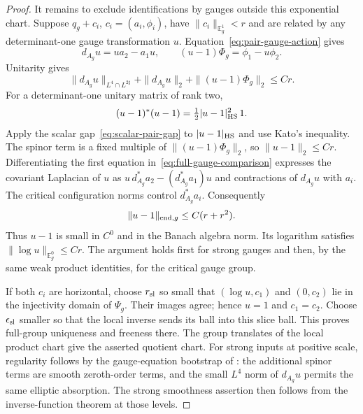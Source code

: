 \documentclass[11pt]{amsart}
\theoremstyle{definition}
\theoremstyle{remark}
\theoremstyle{plain}
\begin{document}
\begin{proof}
It remains to exclude identifications by gauges outside this exponential
chart.  Suppose $q_g+c_i$, $c_i=(a_i,\phi_i)$, have
$\|c_i\|_{\mathbb E_g^1}<r$ and are related by any determinant-one
gauge transformation $u$.
Equation~\eqref{eq:pair-gauge-action} gives
\begin{equation}\label{eq:full-gauge-comparison}
 d_{A_g}u=u a_2-a_1u,\qquad
 (u-1)\Phi_g=\phi_1-u\phi_2.
\end{equation}
Unitarity gives
\[
 \|d_{A_g}u\|_{L^4\cap L^{2\sharp}}+\|d_{A_g}u\|_2
 +\|(u-1)\Phi_g\|_2\leq Cr.
\]
For a determinant-one unitary matrix of rank two,
\begin{equation}\label{eq:su2-displacement}
 (u-1)^*(u-1)=\tfrac12|u-1|_{\rm HS}^2\,1.
\end{equation}
Apply the scalar gap~\eqref{eq:scalar-pair-gap} to $|u-1|_{\rm HS}$
and use Kato's inequality.  The spinor term is a fixed multiple of
$\|(u-1)\Phi_g\|_2$, so $\|u-1\|_2\leq Cr$.
Differentiating the first equation in~\eqref{eq:full-gauge-comparison}
expresses the covariant Laplacian of $u$ as
$u\,d_{A_g}^*a_2-(d_{A_g}^*a_1)u$ and contractions of $d_{A_g}u$
with $a_i$.  The critical configuration norms control $d_{A_g}^*a_i$.
Consequently
\begin{equation}\label{eq:full-gauge-smallness}
 \|u-1\|_{{\rm end},g}\leq C(r+r^2).
\end{equation}
Thus $u-1$ is small in $C^0$ and in the Banach algebra norm.
Its logarithm satisfies $\|\log u\|_{\mathbb E_g^0}\leq Cr$.
The argument holds first for strong gauges and then, by the same weak
product identities, for the critical gauge group.

If both $c_i$ are horizontal, choose $r_{\rm sl}$ so small that
$(\log u,c_1)$ and $(0,c_2)$ lie in the injectivity domain of
$\Psi_g$.  Their images agree; hence $u=1$ and $c_1=c_2$.
Choose $\epsilon_{\rm sl}$ smaller so that the local inverse sends
its ball into this slice ball.  This proves full-group uniqueness and
freeness there.  The group translates of the local product chart give
the asserted quotient chart.  For strong inputs at positive scale,
regularity follows by the gauge-equation bootstrap of
\cite[Lemma~8.1]{FeehanCritical}: the additional spinor terms are
smooth zeroth-order terms, and the small $L^4$ norm of $d_{A_g}u$
permits the same elliptic absorption.  The strong smoothness assertion
then follows from the inverse-function theorem at those levels.
\end{proof}
\end{document}

